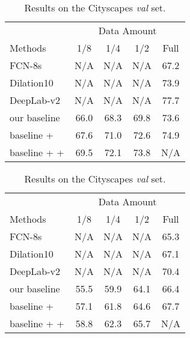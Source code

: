 \documentclass{bmvc2k}
\begin{document}
	\begin{table}
		\begin{minipage}[t]{.49\linewidth}
			\scriptsize
			\caption{Results on the VOC 2012 \emph{val} set.}
			\vspace{1mm}
			\label{table: pascal}
			\centering
			\begin{tabular}{lcccc}
				\toprule
				& \multicolumn{4}{c}{Data Amount} \\
				Methods & 1/8 & 1/4 & 1/2 & Full \\
				\midrule
				FCN-8s~\cite{fcn} &N/A &N/A &N/A & 67.2 \\
				Dilation10~\cite{dilated} &N/A &N/A &N/A & 73.9 \\
				DeepLab-v2~\cite{deeplab} &N/A &N/A &N/A & 77.7 \\
				\midrule
				our baseline     & 66.0 & 68.3 & 69.8 & 73.6 \\
				baseline +  & 67.6 & 71.0 & 72.6 & 74.9\\
				baseline +  +  & 69.5 & 72.1 & 73.8 & N/A \\
				
				\bottomrule
			\end{tabular}
		\end{minipage}
\hfill
		\begin{minipage}[t]{.49\linewidth}
			\scriptsize
			\caption{Results on the Cityscapes \emph{val} set.}
			
			\label{table: cityscapes}
			\centering
			\begin{tabular}{lcccc}
				\toprule
				
				& \multicolumn{4}{c}{Data Amount} \\
				Methods & 1/8 & 1/4 & 1/2 & Full \\
				\midrule
				FCN-8s~\citep{fcn} &N/A &N/A &N/A & 65.3 \\
				Dilation10~\citep{dilated} &N/A &N/A &N/A & 67.1 \\
				DeepLab-v2~\citep{deeplab} &N/A &N/A &N/A & 70.4 \\
				\midrule
				our baseline     & 55.5 & 59.9 & 64.1 & 66.4 \\
				
				baseline +  & 57.1 & 61.8 & 64.6 & 67.7 \\
				baseline +  +  & 58.8 & 62.3 & 65.7 & N/A \\
				
				\bottomrule
			\end{tabular}
		\end{minipage}
		\vspace{-5mm}
	\end{table}
	
\end{document}
